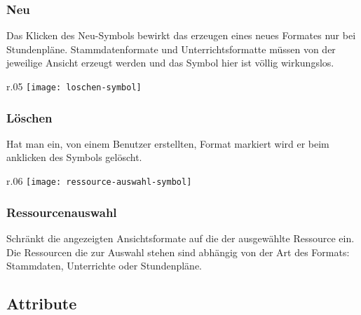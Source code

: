\subsubsection{Neu}

\vspace{10pt}

\noindent
Das Klicken des Neu-Symbols bewirkt das erzeugen eines neues Formates nur bei Stundenpläne. Stammdatenformate und Unterrichtsformatte müssen von der jeweilige Ansicht erzeugt werden und das Symbol hier ist völlig wirkungslos.\\

\begin{wrapfigure}{r}{.05\textwidth}
	\vspace{-14pt}
	\texttt{[image: loschen-symbol]}
	\vspace{-40pt}
\end{wrapfigure}

\subsubsection{Löschen}

\vspace{10pt}

\noindent
Hat man ein, von einem Benutzer erstellten, Format markiert wird er beim anklicken des Symbols gelöscht.\\

\begin{wrapfigure}{r}{.06\textwidth}
	\vspace{-14pt}
	\texttt{[image: ressource-auswahl-symbol]}
	\vspace{-40pt}
\end{wrapfigure}

\subsubsection{Ressourcenauswahl}

\vspace{10pt}

\noindent
Schränkt die angezeigten Ansichtsformate auf die der ausgewählte Ressource ein. Die Ressourcen die zur Auswahl stehen sind abhängig von der Art des Formats: Stammdaten, Unterrichte oder Stundenpläne.\\ 

\subsection{Attribute}

